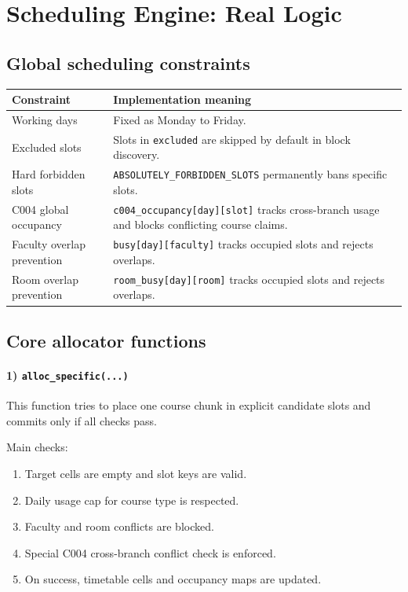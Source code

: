 \documentclass[12pt,a4paper]{article}
\begin{document}
\section{Scheduling Engine: Real Logic}

\subsection{Global scheduling constraints}
\begin{longtable}{p{}p{}}
\toprule
\textbf{Constraint} & \textbf{Implementation meaning} \\
\midrule
\endhead
Working days & Fixed as Monday to Friday. \\
Excluded slots & Slots in \texttt{excluded} are skipped by default in block discovery. \\
Hard forbidden slots & \texttt{ABSOLUTELY\_FORBIDDEN\_SLOTS} permanently bans specific slots. \\
C004 global occupancy & \texttt{c004\_occupancy[day][slot]} tracks cross-branch usage and blocks conflicting course claims. \\
Faculty overlap prevention & \texttt{busy[day][faculty]} tracks occupied slots and rejects overlaps. \\
Room overlap prevention & \texttt{room\_busy[day][room]} tracks occupied slots and rejects overlaps. \\
\bottomrule
\end{longtable}

\subsection{Core allocator functions}

\paragraph{1) \texttt{alloc\_specific(...)}}
This function tries to place one course chunk in explicit candidate slots and commits only if all checks pass.

Main checks:
\begin{enumerate}[leftmargin=1.2cm]
  \item Target cells are empty and slot keys are valid.
  \item Daily usage cap for course type is respected.
  \item Faculty and room conflicts are blocked.
  \item Special C004 cross-branch conflict check is enforced.
  \item On success, timetable cells and occupancy maps are updated.
\end{enumerate}
\end{document}

